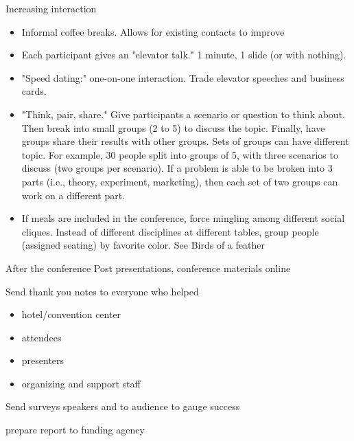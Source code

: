 Increasing interaction
\begin{itemize}
    \item Informal coffee breaks. Allows for existing contacts to improve
    \item Each participant gives an "elevator talk." 1 minute, 1 slide (or with nothing).
    \item "Speed dating:" one-on-one interaction. Trade elevator speeches and business cards.
    \item "Think, pair, share." Give participants a scenario or question to think about. Then break into small groups (2 to 5) to discuss the topic. Finally, have groups share their results with other groups. Sets of groups can have different topic. For example, 30 people split into groups of 5, with three scenarios to discuss (two groups per scenario). If a problem is able to be broken into 3 parts (i.e., theory, experiment, marketing), then each set of two groups can work on a different part.
    \item If meals are included in the conference, force mingling among different social cliques. Instead of different disciplines at different tables, group people (assigned seating) by favorite color. See Birds of a feather
\end{itemize}

After the conference
Post presentations, conference materials online

Send thank you notes to everyone who helped
\begin{itemize}
    \item hotel/convention center
    \item attendees
    \item presenters
    \item organizing and support staff
\end{itemize}
Send surveys speakers and to audience to gauge success


prepare report to funding agency